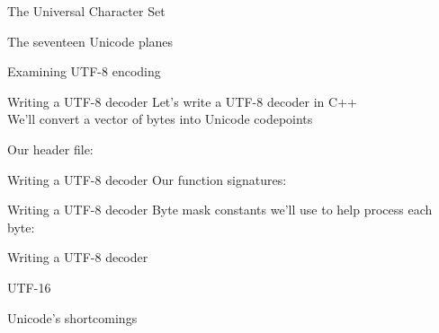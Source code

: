 \documentclass[../index.tex]{subfiles}
\begin{document}
\renewcommand{\currenttitle}{The Universal Character Set}
\begin{frame}{\currenttitle}
\end{frame}

\renewcommand{\currenttitle}{The seventeen Unicode planes}
\begin{frame}{\currenttitle}
\end{frame}

\renewcommand{\currenttitle}{Examining UTF-8 encoding}
\begin{frame}{\currenttitle}
\end{frame}

\renewcommand{\currenttitle}{Writing a UTF-8 decoder}
\newcommand{\decoderheaderlisting}[2]{%
}
\begin{frame}{\currenttitle}
  Let's write a UTF-8 decoder in C++ \\

  We'll convert a vector of bytes into Unicode codepoints \\

  \vspace*{2em}

  Our header file:

  \decoderheaderlisting{4}{7}
\end{frame}

\begin{frame}{\currenttitle}
  Our function signatures:

  \decoderheaderlisting{1}{2}
  \decoderheaderlisting{14}{18}
\end{frame}

\begin{frame}{\currenttitle}
  Byte mask constants we'll use to help process each byte:

  \decoderheaderlisting{9}{12}
\end{frame}

\newcommand{\decodercodelisting}[2]{%
}
\begin{frame}{\currenttitle}
  \decodercodelisting{8}{10}
\end{frame}

\renewcommand{\currenttitle}{UTF-16}
\begin{frame}{\currenttitle}
\end{frame}

\renewcommand{\currenttitle}{Unicode's shortcomings}
\begin{frame}{\currenttitle}
\end{frame}

\end{document}
